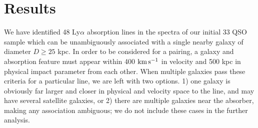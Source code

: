 \documentclass[iop]{emulateapj-rtx4}
\begin{document}
\section{Results}

We have identified 48 Ly$\alpha$ absorption lines in the spectra of our initial 33 QSO sample which can be unambiguously associated with a single nearby galaxy of diameter $D\geq25$ kpc. In order to be considered for a pairing, a galaxy and absorption feature must appear within 400 $\rm km\, s^{-1}$ in velocity and 500 kpc in physical impact parameter from each other. When multiple galaxies pass these criteria for a particular line, we are left with two options. 1) one galaxy is obviously far larger and closer in physical and velocity space to the line, and may have several satellite galaxies, or 2) there are multiple galaxies near the absorber, making any association ambiguous; we do not include these cases in the further analysis.
\end{document}
